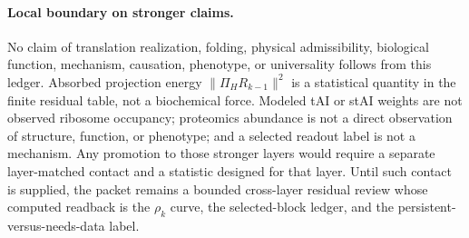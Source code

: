 \paragraph{Local boundary on stronger claims.}
No claim of translation realization, folding, physical admissibility, biological function, mechanism, causation, phenotype, or universality follows from this ledger.  Absorbed projection energy $\lVert \Pi_H R_{k-1}\rVert^2$ is a statistical quantity in the finite residual table, not a biochemical force.  Modeled tAI or stAI weights are not observed ribosome occupancy; proteomics abundance is not a direct observation of structure, function, or phenotype; and a selected readout label is not a mechanism.  Any promotion to those stronger layers would require a separate layer-matched contact and a statistic designed for that layer.  Until such contact is supplied, the packet remains a bounded cross-layer residual review whose computed readback is the $\rho_k$ curve, the selected-block ledger, and the persistent-versus-needs-data label.
